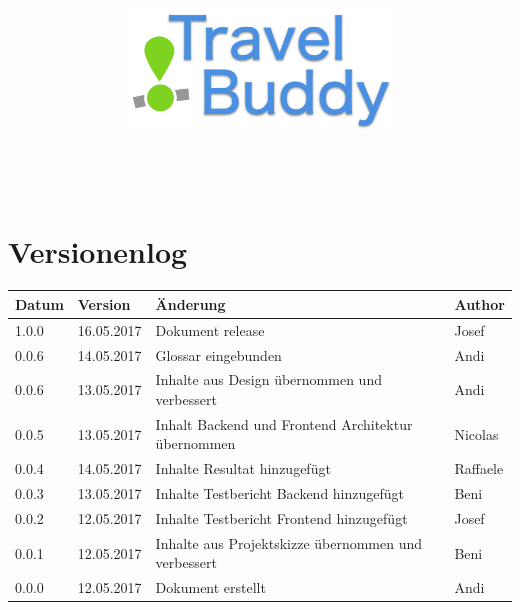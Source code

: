 \documentclass[a4paper,10pt,xetex]{article}
\title{
  \includegraphics[width=7cm]{travel-buddy_white}\\[\bigskipamount]
  \documenttitle\\[\bigskipamount]
}
\author{\documentauthors}
\date{\parbox{\linewidth}{\centering%
  IT15TA ZH \hspace*{3cm} Gruppe 3\endgraf\bigskip
  Dokumentversion \documentversion, \documentdate\endgraf
}}
\begin{document}

\maketitle\newpage

{
\hypersetup{linkcolor=black}
\setcounter{tocdepth}{4}
\tableofcontents
}

\newpage

\section{Versionenlog}\label{versionenlog}

\tabulinesep=1.2mm

\begin{longtabu} to \textwidth { | l | l | X[l] | l | }
  \hline
  \textbf{Datum} & \textbf{Version} & \textbf{Änderung} & \textbf{Author} \\
  \hline
  \endhead

  1.0.0 & 16.05.2017 & Dokument release & Josef\\
  \hline

  0.0.6 & 14.05.2017 & Glossar eingebunden & Andi\\
  \hline

  0.0.6 & 13.05.2017 & Inhalte aus Design übernommen und verbessert & Andi\\
  \hline

  0.0.5 & 13.05.2017 & Inhalt Backend und Frontend Architektur übernommen & Nicolas\\
  \hline

  0.0.4 & 14.05.2017 & Inhalte Resultat hinzugefügt & Raffaele\\
  \hline

  0.0.3 & 13.05.2017 & Inhalte Testbericht Backend hinzugefügt & Beni\\
  \hline

  0.0.2 & 12.05.2017 & Inhalte Testbericht Frontend hinzugefügt & Josef\\
  \hline

  0.0.1 & 12.05.2017 & Inhalte aus Projektskizze übernommen und verbessert & Beni\\
  \hline

  0.0.0 & 12.05.2017 & Dokument erstellt & Andi\\
  \hline
\end{longtabu}
\newpage


\end{document}
